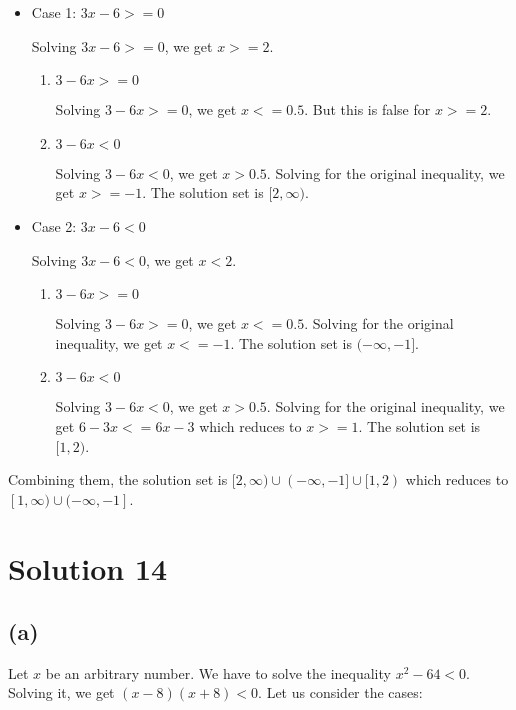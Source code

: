 \documentclass{article}
\begin{document}
\begin{itemize}
\item Case 1: $3x - 6 >= 0$

  Solving $3x - 6 >= 0$, we get $x >= 2$.
  
  \begin{enumerate}
  \item $3 - 6x >= 0$

    Solving $3 - 6x >= 0$, we get $x <= 0.5$. But this is false for
    $x >= 2$.
    
  \item $3 - 6x < 0$

    Solving $3 - 6x < 0$, we get $x > 0.5$. Solving for the original
    inequality, we get $x >= -1$. The solution set is $[2, \infty)$.
  \end{enumerate}

\item Case 2: $3x - 6 < 0$

  Solving $3x - 6 < 0$, we get $x < 2$.

  \begin{enumerate}
  \item $3 - 6x >= 0$

    Solving $3 - 6x >= 0$, we get $x <= 0.5$. Solving for the original
    inequality, we get $x <= -1$. The solution set is $(-\infty, -1]$.
    
  \item $3 - 6x < 0$

    Solving $3 - 6x < 0$, we get $x > 0.5$. Solving for the original
    inequality, we get $6 -3x <= 6x - 3$ which reduces to $x >= 1$.
    The solution set is $[1, 2)$.
  \end{enumerate}

\end{itemize}

Combining them, the solution set is
$[2, \infty) \cup (-\infty, -1] \cup [1, 2)$ which reduces to
$[1, \infty) \cup (-\infty, -1]$.

\section{Solution 14}

\subsection{(a)}

Let $x$ be an arbitrary number. We have to solve the inequality
$x^2 - 64 < 0$. Solving it, we get $(x - 8)(x + 8) < 0$. Let us
consider the cases:
\end{document}
